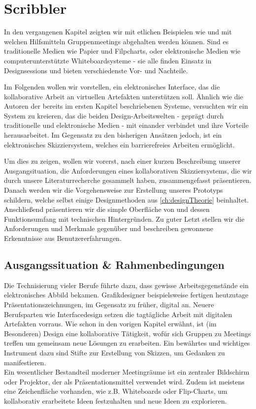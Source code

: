 \chapter{Scribbler}\label{ch:scribbler}

In den vergangenen Kapitel zeigten wir mit etlichen Beispielen wie und mit welchen Hilfsmitteln Gruppenmeetings abgehalten werden können. Sind es traditionelle Medien wie Papier und Filpcharts, oder elektronische Medien wie computerunterstützte Whiteboardsysteme - sie alle finden Einsatz in Designsessions und bieten verschiedenste Vor- und Nachteile.

\medskip Im Folgenden wollen wir \scribbler vorstellen, ein elektronisches Interface, das die kollaborative Arbeit an virtuellen Artefakten unterstützen soll. Ähnlich wie die Autoren der bereits im ersten Kapitel beschriebenen Systeme, versuchten wir ein System zu kreieren, das die beiden Design-Arbeitswelten - geprägt durch traditionelle und elektronische Medien - mit einander verbindet und ihre Vorteile herausarbeitet. Im Gegensatz zu den bisherigen Ansätzen jedoch, ist \scribbler ein elektronisches Skizziersystem, welches ein barrierefreies Arbeiten ermöglicht.

\medskip Um dies zu zeigen, wollen wir vorerst, nach einer kurzen Beschreibung unserer Ausgangsituation, die Anforderungen eines kollaborativen Skizziersystems, die wir durch unsere Literaturrecherche gesammelt haben, zusammengefasst präsentieren. Danach werden wir die Vorgehensweise zur Erstellung unseres Prototyps schildern, welche selbst einige Designmethoden aus \autoref{ch:designTheorie} beinhaltet. Anschließend präsentieren wir die simple Oberfläche von \scribbler und dessen Funktionsumfang mit technischen Hintergründen. Zu guter Letzt stellen wir die Anforderungen und Merkmale gegenüber und beschreiben gewonnene Erkenntnisse aus Benutzererfahrungen.

\section{Ausgangssituation \& Rahmenbedingungen} \label{sec:ausgangssituation}
Die Technisierung vieler Berufe führte dazu, dass gewisse Arbeitsgegenstände ein elektronisches Abbild bekamen. Grafikdesigner beispielsweise fertigen heutzutage Präsentationszeichnungen, im Gegensatz zu früher, digital an. Neuere Berufsparten wie Interfacedesign setzen die tagtägliche Arbeit mit digitalen Artefakten vorraus. Wie schon in den vorigen Kapitel erwähnt, ist (im Besonderen) Design eine kollaborative Tätigkeit, wofür sich Gruppen zu Meetings treffen um gemeinsam neue Lösungen zu erarbeiten. Ein bewährtes und wichtiges Instrument dazu sind Stifte zur Erstellung von Skizzen, um Gedanken zu manifestieren.\\
Ein wesentlicher Bestandteil moderner Meetingräume ist ein zentraler Bildschirm oder Projektor, der als Präsentationsmittel verwendet wird. Zudem ist meistens eine Zeichenfläche vorhanden, wie z.B. Whiteboards oder Flip-Charts, um kollaborativ erarbeitete Ideen festzuhalten und neue Ideen zu explorieren.

